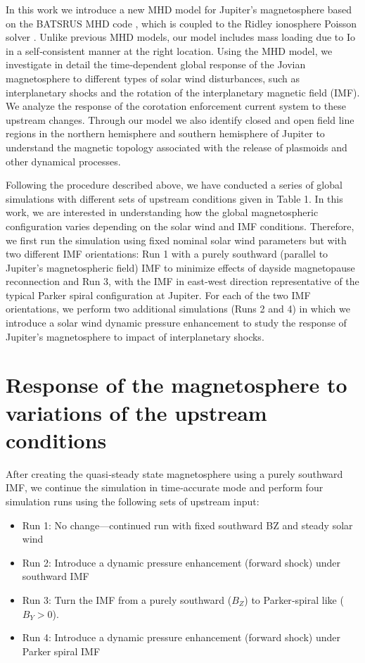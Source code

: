 In this work we introduce a new MHD model for Jupiter's magnetosphere based on the BATSRUS MHD code \cite{Powell1999a,Gombosi2002b}, which is coupled to the Ridley ionosphere Poisson solver \cite{Ridley2004IonosphericConductance}. Unlike previous MHD models, our model includes mass loading due to Io in a self‐consistent manner at the right location. Using the MHD model, we investigate in detail the time‐dependent global response of the Jovian magnetosphere to different types of solar wind disturbances, such as interplanetary shocks and the rotation of the interplanetary magnetic field (IMF). We analyze the response of the corotation enforcement current system to these upstream changes. Through our model we also identify closed and open field line regions in the northern hemisphere and southern hemisphere of Jupiter to understand the magnetic topology associated with the release of plasmoids and other dynamical processes. 

Following the procedure described above, we have conducted a series of global simulations with different sets of upstream conditions given in Table 1. In this work, we are interested in understanding how the global magnetospheric configuration varies depending on the solar wind and IMF conditions. Therefore, we first run the simulation using fixed nominal solar wind parameters but with two different IMF orientations: Run 1 with a purely southward (parallel to Jupiter's magnetospheric field) IMF to minimize effects of dayside magnetopause reconnection and Run 3, with the IMF in east‐west direction representative of the typical Parker spiral configuration at Jupiter. For each of the two IMF orientations, we perform two additional simulations (Runs 2 and 4) in which we introduce a solar wind dynamic pressure enhancement to study the response of Jupiter's magnetosphere to impact of interplanetary shocks. 

\section{Response of the magnetosphere to variations of the upstream conditions}

After creating the quasi‐steady state magnetosphere using a purely southward IMF, we continue the simulation in time‐accurate mode and perform four simulation runs using the following sets of upstream input: 

\begin{itemize}
    \item Run 1: No change—continued run with fixed southward BZ and steady solar wind
    \item Run 2: Introduce a dynamic pressure enhancement (forward shock) under southward IMF
    \item Run 3: Turn the IMF from a purely southward ($B_Z$) to Parker‐spiral like ($B_Y > 0$).
    \item Run 4: Introduce a dynamic pressure enhancement (forward shock) under Parker spiral IMF
\end{itemize}

